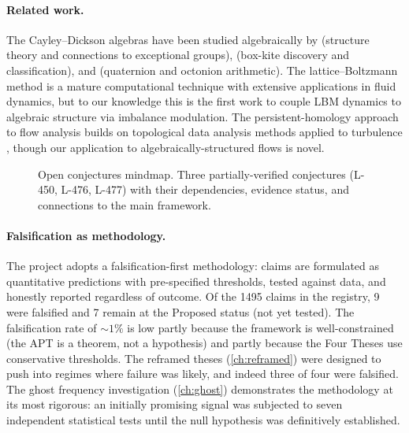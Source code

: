 \documentclass[12pt,openany]{report}
\theoremstyle{definition}
\theoremstyle{plain}
\theoremstyle{remark}
\newcommand{\claimcount}{1495}
\begin{document}
\paragraph{Related work.}
The Cayley--Dickson algebras have been studied algebraically by
\citet{Baez2002Octonions} (structure theory and connections to
exceptional groups), \citet{deMarrais2000BoxKites} (box-kite discovery
and classification), and \citet{Conway2003} (quaternion and octonion
arithmetic).  The lattice--Boltzmann method is a mature computational
technique \cite{Chen1998LatticeBoltzmann} with extensive applications
in fluid dynamics, but to our knowledge this is the first work to
couple LBM dynamics to algebraic structure via imbalance modulation.
The persistent-homology approach to flow analysis builds on topological
data analysis methods applied to turbulence
\cite{Kramar2016PersistentHomology}, though our application to
algebraically-structured flows is novel.

\begin{figure}[htbp]
\centering

\caption{Open conjectures mindmap.  Three partially-verified conjectures
(L-450, L-476, L-477) with their dependencies, evidence status, and
connections to the main framework.}
\label{fig:conjectures}
\end{figure}

\paragraph{Falsification as methodology.}
The project adopts a falsification-first methodology: claims are
formulated as quantitative predictions with pre-specified thresholds,
tested against data, and honestly reported regardless of outcome.  Of
the \claimcount{} claims in the registry, 9 were falsified and 7 remain
at the Proposed status (not yet tested).  The falsification rate of
${\sim}1\%$ is low partly because the framework is well-constrained
(the APT is a theorem, not a hypothesis) and partly because the Four
Theses use conservative thresholds.  The reframed theses
(\cref{ch:reframed}) were designed to push into regimes where failure
was likely, and indeed three of four were falsified.  The ghost
frequency investigation (\cref{ch:ghost}) demonstrates the methodology
at its most rigorous: an initially promising signal was subjected to
seven independent statistical tests until the null hypothesis was
definitively established.
\end{document}
